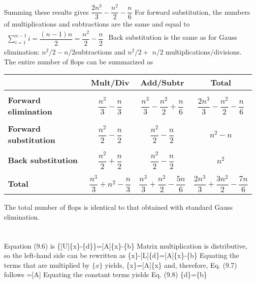 \documentclass[../main.tex]{subfiles}
\begin{document}
\bigbreak
Summing these results gives
\bigbreak
$\dfrac{2 n^{3}}{3}-\dfrac{n^{2}}{2}-\dfrac{n}{6}$
\bigbreak
For forward substitution, the numbers of multiplications and subtractions are the same and equal to
\bigbreak$
\begin{aligned}\sum_{i=1}^{n-1} i=\dfrac{(n-1) n}{2}=\dfrac{n^{2}}{2}-\dfrac{n}{2}
\end{aligned}$
\bigbreak
Back substitution is the same as for Gauss elimination: $n^{2} / 2-n / 2$\smallbreak subtractions and $n^{2} / 2+$ $n / 2$ multiplications/divisions. The entire number of flops can be summarized as
\bigbreak
\begin{tabular}{|l|c|c|c|}
\hline
 & \textbf{Mult/Div} & \textbf{Add/Subtr} & \textbf{Total} \\
\hline
\\
\textbf{Forward elimination} & $\dfrac{n^{3}}{3}-\dfrac{n}{3}$ & $\dfrac{n^{3}}{3}-\dfrac{n^{2}}{2}+\dfrac{n}{6}$ & $\dfrac{2 n^{3}}{3}-\dfrac{n^{2}}{2}-\dfrac{n}{6}$ \\
\hline
\\
\textbf{Forward substitution} & $\dfrac{n^{2}}{2}-\dfrac{n}{2}$ & $\dfrac{n^{2}}{2}-\dfrac{n}{2}$ & $n^{2}-n$ \\
\hline
\\
\textbf{Back substitution} & $\dfrac{n^{2}}{2}+\dfrac{n}{2}$ & $\dfrac{n^{2}}{2}-\dfrac{n}{2}$ & $n^{2}$ \\
\hline
\\
\textbf{Total} & $\dfrac{n^{3}}{3}+n^{2}-\dfrac{n}{3}$ & $\dfrac{n^{3}}{3}+\dfrac{n^{2}}{2}-\dfrac{5 n}{6}$ & $\dfrac{2 n^{3}}{3}+\dfrac{3 n^{2}}{2}-\dfrac{7 n}{6}$ \\
\hline
\end{tabular}
\bigbreak
The total number of flops is identical to that obtained with standard Gauss elimination.
\bigbreak


\section{}
Equation (9.6) is
\bigbreak
[L]\{[U]\{x\}-\{d\}\}=[A]\{x\}-\{b\}
\bigbreak
Matrix multiplication is distributive, so the left-hand side can be rewritten as
\bigbreak
[L][U]\{x\}-[L]\{d\}=[A]\{x\}-\{b\}
\bigbreak
Equating the terms that are multiplied by $\{x\}$ yields,
\bigbreak
[L][U]\{x\}=[A]\{x\}
\bigbreak
and, therefore, Eq. (9.7) follows
\bigbreak
[L][U]=[A]
\bigbreak
Equating the constant terms yields Eq. (9.8)
\bigbreak
[L]\{d\}=\{b\}
\bigbreak
\end{document}
